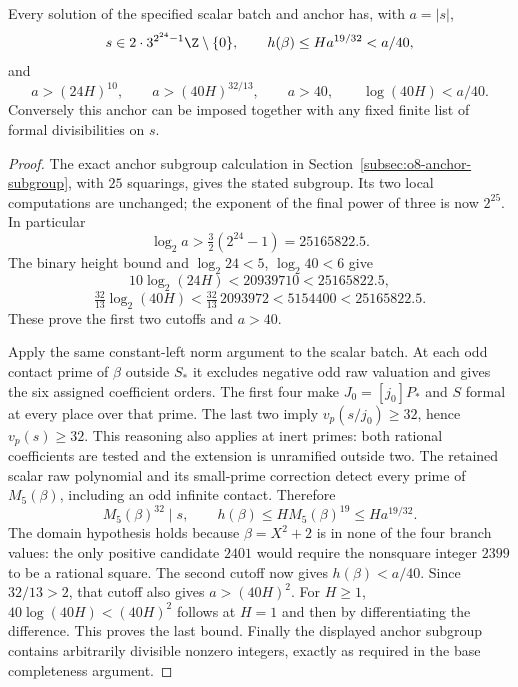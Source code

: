 \begin{lemma}
\label{lem:quartic-height19-anchor}
Every solution of the specified scalar batch and anchor has, with
$a=|s|$,
\[
 s\in2\cdot3^{2^{24}-1}\Z\setminus\{0\},\qquad
 h(\beta)\le H a^{19/32}<a/40,
\]
and
\begin{equation}\label{eq:quartic-cutoffs19}
 a>(24H)^{10},\qquad a>(40H)^{32/13},\qquad
 a>40,\qquad \log(40H)<a/40.
\end{equation}
Conversely this anchor can be imposed together with any fixed finite
list of formal divisibilities on $s$.
\end{lemma}
\begin{proof}
The exact anchor subgroup calculation in
Section~\ref{subsec:o8-anchor-subgroup}, with $25$ squarings, gives the
stated subgroup. Its two local computations are unchanged; the exponent
of the final power of three is now $2^{25}$.
In particular
\[
 \log_2 a>\tfrac32(2^{24}-1)=25165822.5.
\]
The binary height bound and $\log_2 24<5$, $\log_2 40<6$ give
\[
 10\log_2(24H)<20939710<25165822.5,
\]
\[
 \tfrac{32}{13}\log_2(40H)
 <\tfrac{32}{13}\,2093972<5154400<25165822.5.
\]
These prove the first two cutoffs and $a>40$.

Apply the same constant-left norm argument to the scalar batch. At each
odd contact prime of $\beta$ outside $S_*$ it excludes negative odd raw
valuation and gives the six assigned coefficient orders. The first four
make $J_0=[j_0]P_*$ and $S$ formal at every place over that prime. The
last two imply $v_p(s/j_0)\ge32$, hence $v_p(s)\ge32$. This reasoning
also applies at inert primes: both rational coefficients are tested and
the extension is unramified outside two. The retained scalar raw
polynomial and its small-prime correction detect every prime of
$M_5(\beta)$, including an odd infinite contact. Therefore
\[
 M_5(\beta)^{32}\mid s,
 \qquad h(\beta)\le H M_5(\beta)^{19}\le Ha^{19/32}.
\]
The domain hypothesis holds because $\beta=X^2+2$ is in none of the four
branch values: the only positive candidate $2401$ would require the
nonsquare integer $2399$ to be a rational square. The second cutoff
now gives $h(\beta)<a/40$.
Since $32/13>2$, that cutoff also gives $a>(40H)^2$.
For $H\ge1$, $40\log(40H)<(40H)^2$ follows at $H=1$ and then by
differentiating the difference. This proves the last bound.
Finally the displayed anchor subgroup contains arbitrarily divisible
nonzero integers, exactly as required in the base completeness argument.
\end{proof}

